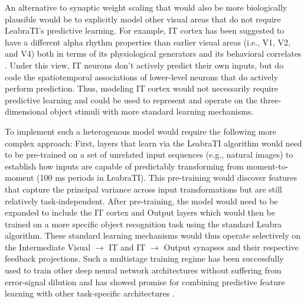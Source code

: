\documentclass[dwyatte_dissertation.tex]{subfiles}
\begin{document}
An alternative to synaptic weight scaling that would also be more biologically plausible would be to explicitly model other visual areas that do not require LeabraTI's predictive learning. For example, IT cortex has been suggested to have a different alpha rhythm properties than earlier visual areas (i.e., V1, V2, and V4) both in terms of its physiological generators and its behavioral correlates \cite{BollimuntaChenSchroederEtAl08}. Under this view, IT neurons don't actively predict their own inputs, but do code the spatiotemporal associations \cite{CoxMeierOerteltEtAl05,LiDiCarlo08,LiDiCarlo10,LiDiCarlo12} of lower-level neurons that do actively perform prediction. Thus, modeling IT cortex would not necessarily require predictive learning and could be used to represent and operate on the three-dimensional object stimuli with more standard learning mechanisms. 

To implement such a heterogenous model would require the following more complex approach: First, layers that learn via the LeabraTI algorithm would need to be pre-trained on a set of unrelated input sequences (e.g., natural images) to establish how inputs are capable of predictably transforming from moment-to-moment (100 ms periods in LeabraTI). This pre-training would discover features that capture the principal variance across input transformations but are still relatively task-independent. After pre-training, the model would need to be expanded to include the IT cortex and Output layers which would then be trained on a more specific object recognition task using the standard Leabra algorithm.  These standard learning mechanisms would thus operate selectively on the Intermediate Visual $\rightarrow$ IT and IT $\rightarrow$ Output synapses and their respective feedback projections. Such a multistage training regime has been successfully used to train other deep neural network architectures without suffering from error-signal dilution \cite{HintonSalakhutdinov06} and has showed promise for combining predictive feature learning with other task-specific architectures  \cite{OReillyWyatteRohrlichEtAlInPrep}.
\end{document}
